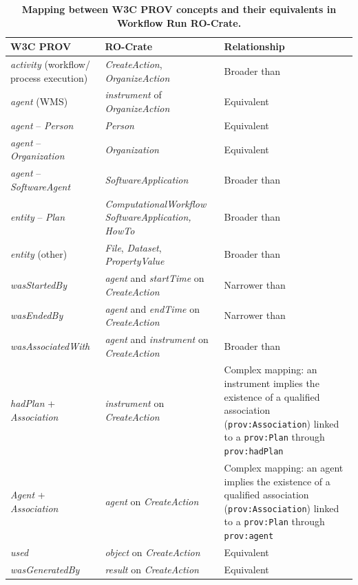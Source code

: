 \begin{table}[!ht]
  \centering
  \caption{
  {\bf Mapping between W3C PROV concepts and their equivalents in Workflow Run RO-Crate.}}
  \begin{tabular}{p{35mm}|p{40mm}|p{40mm}}
  \hline
  {\bf W3C PROV} & {\bf RO-Crate} & \textbf{Relationship} \\
  \hline
  
  \emph{activity} (workflow/ \newline process execution) 
    & \emph{CreateAction}, \emph{OrganizeAction} & Broader than \\ \hline
  \emph{agent} (WMS) & \emph{instrument} of \emph{OrganizeAction} & Equivalent \\ \hline
  \emph{agent} -- \emph{Person} & \emph{Person}  & Equivalent \\ \hline
  \emph{agent} -- \emph{Organization} & \emph{Organization}  & Equivalent \\ \hline
  \emph{agent} -- \emph{SoftwareAgent} & \emph{SoftwareApplication}  & Broader than \\ \hline
  \emph{entity} -- \emph{Plan} & 
    \emph{ComputationalWorkflow} \emph{SoftwareApplication, HowTo}  
    & Broader than \\ \hline
  \emph{entity} (other) & \emph{File}, \emph{Dataset}, \emph{PropertyValue} & Broader than \\ \hline
  \emph{wasStartedBy} & \emph{agent} and \emph{startTime} on  \emph{CreateAction} & Narrower than  \\ \hline
  \emph{wasEndedBy} & \emph{agent} and \emph{endTime} on  \emph{CreateAction} & Narrower than \\ \hline
  \emph{wasAssociatedWith} & \emph{agent} and \emph{instrument} on  \emph{CreateAction} & Broader than \\ \hline
  \emph{hadPlan} + \emph{Association} &  \emph{instrument} on \emph{CreateAction} & 
    Complex mapping: an instrument implies the existence of a qualified association (\texttt{prov:Association}) linked to a \texttt{prov:Plan} through \texttt{prov:hadPlan}
    \\ \hline
  \emph{Agent} + \emph{Association} &  \emph{agent} on \emph{CreateAction} & 
    Complex mapping: an agent implies the existence of a qualified association (\texttt{prov:Association}) linked to a \texttt{prov:Plan} through \texttt{prov:agent}
    \\ \hline  
  \emph{used} & \emph{object} on \emph{CreateAction} & Equivalent \\ \hline 
  \emph{wasGeneratedBy} & \emph{result} on  \emph{CreateAction} & Equivalent \\ \hline
  
  \end{tabular}
  \label{ch54:rocrate_prov_mapping}
\end{table}
  

